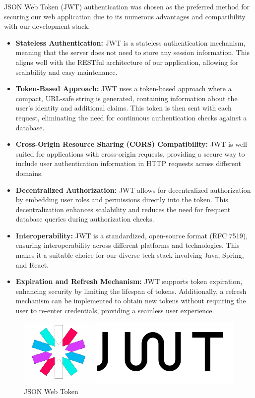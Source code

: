\documentclass{Configuration_Files/Template}
\begin{document}
JSON Web Token (JWT) authentication was chosen as the preferred method for securing our web application due to its numerous advantages and compatibility with our development stack.

\begin{itemize}
    \item \textbf{Stateless Authentication:} JWT is a stateless authentication mechanism, meaning that the server does not need to store any session information. This aligns well with the RESTful architecture of our application, allowing for scalability and easy maintenance.
    
    \item \textbf{Token-Based Approach:} JWT uses a token-based approach where a compact, URL-safe string is generated, containing information about the user's identity and additional claims. This token is then sent with each request, eliminating the need for continuous authentication checks against a database.
    
    \item \textbf{Cross-Origin Resource Sharing (CORS) Compatibility:} JWT is well-suited for applications with cross-origin requests, providing a secure way to include user authentication information in HTTP requests across different domains.
    
    \item \textbf{Decentralized Authorization:} JWT allows for decentralized authorization by embedding user roles and permissions directly into the token. This decentralization enhances scalability and reduces the need for frequent database queries during authorization checks.
    
    \item \textbf{Interoperability:} JWT is a standardized, open-source format (RFC 7519), ensuring interoperability across different platforms and technologies. This makes it a suitable choice for our diverse tech stack involving Java, Spring, and React.
    
    \item \textbf{Expiration and Refresh Mechanism:} JWT supports token expiration, enhancing security by limiting the lifespan of tokens. Additionally, a refresh mechanism can be implemented to obtain new tokens without requiring the user to re-enter credentials, providing a seamless user experience.\\
\end{itemize}

\begin{figure}[h]
    \centering
    \includegraphics[scale = 0.12]{ITD_latex/Images/Frameworks/jwt.png}
    \caption{JSON Web Token}
\end{figure}
\end{document}
